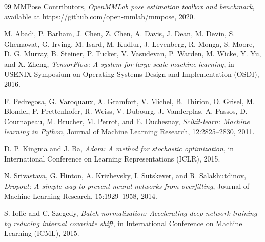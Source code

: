 \begin{thebibliography}{99}
MMPose Contributors,
\textit{OpenMMLab pose estimation toolbox and benchmark},
available at https://github.com/open-mmlab/mmpose, 2020.

M. Abadi, P. Barham, J. Chen, Z. Chen, A. Davis, J. Dean, M. Devin, S. Ghemawat, G. Irving, M. Isard, M. Kudlur, J. Levenberg, R. Monga, S. Moore, D. G. Murray, B. Steiner, P. Tucker, V. Vasudevan, P. Warden, M. Wicke, Y. Yu, and X. Zheng,
\textit{TensorFlow: A system for large-scale machine learning},
in USENIX Symposium on Operating Systems Design and Implementation (OSDI), 2016.

F. Pedregosa, G. Varoquaux, A. Gramfort, V. Michel, B. Thirion, O. Grisel, M. Blondel, P. Prettenhofer, R. Weiss, V. Dubourg, J. Vanderplas, A. Passos, D. Cournapeau, M. Brucher, M. Perrot, and E. Duchesnay,
\textit{Scikit-learn: Machine learning in Python},
Journal of Machine Learning Research, 12:2825--2830, 2011.

D. P. Kingma and J. Ba,
\textit{Adam: A method for stochastic optimization},
in International Conference on Learning Representations (ICLR), 2015.

N. Srivastava, G. Hinton, A. Krizhevsky, I. Sutskever, and R. Salakhutdinov,
\textit{Dropout: A simple way to prevent neural networks from overfitting},
Journal of Machine Learning Research, 15:1929--1958, 2014.

S. Ioffe and C. Szegedy,
\textit{Batch normalization: Accelerating deep network training by reducing internal covariate shift},
in International Conference on Machine Learning (ICML), 2015.

\end{thebibliography}
